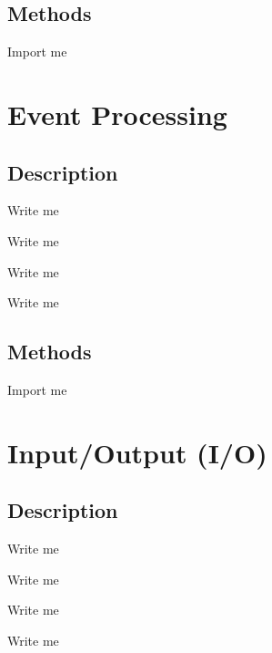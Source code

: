 \documentclass[letterpaper,10pt,english]{sphinxmanual}
\begin{document}
\subsection{Methods}
\label{\detokenize{Sub-Packages:methods}}
\begin{DUlineblock}{0em}
\item[] Import me
\end{DUlineblock}


\section{Event Processing}
\label{\detokenize{Sub-Packages:event-processing}}\label{\detokenize{Sub-Packages:event-processing-module}}

\subsection{Description}
\label{\detokenize{Sub-Packages:id1}}
\begin{DUlineblock}{0em}
\item[] Write me
\item[] Write me
\item[] Write me
\item[] Write me
\end{DUlineblock}


\subsection{Methods}
\label{\detokenize{Sub-Packages:id2}}
\begin{DUlineblock}{0em}
\item[] Import me
\end{DUlineblock}


\section{Input/Output (I/O)}
\label{\detokenize{Sub-Packages:input-output-i-o}}\label{\detokenize{Sub-Packages:io-module}}

\subsection{Description}
\label{\detokenize{Sub-Packages:id3}}
\begin{DUlineblock}{0em}
\item[] Write me
\item[] Write me
\item[] Write me
\item[] Write me
\end{DUlineblock}
\end{document}
